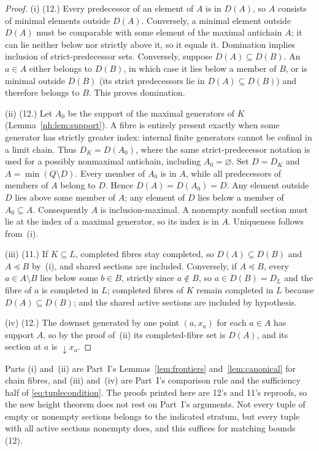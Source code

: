 \documentclass[11pt,a4paper]{article}
\theoremstyle{definition}
\theoremstyle{remark}
\begin{document}
\begin{proof}
(i) (12.) Every predecessor of an element of $A$ is in $D(A)$, so $A$ consists
of minimal elements outside $D(A)$. Conversely, a minimal element outside
$D(A)$ must be comparable with some element of the maximal antichain $A$; it
can lie neither below nor strictly above it, so it equals it. Domination
implies inclusion of strict-predecessor sets. Conversely, suppose
$D(A)\subseteq D(B)$. An $a\in A$ either belongs to $D(B)$, in which case it
lies below a member of $B$, or is minimal outside $D(B)$ (its strict
predecessors lie in $D(A)\subseteq D(B)$) and therefore belongs to $B$. This
proves domination.

(ii) (12.) Let $A_0$ be the support of the maximal generators of $K$
(Lemma~\ref{nh:lem:support}). A fibre is entirely present exactly when some
generator has strictly greater index: internal finite generators cannot be
cofinal in a limit chain. Thus $D_K=D(A_0)$, where the same strict-predecessor
notation is used for a possibly nonmaximal antichain, including
$A_0=\varnothing$. Set $D=D_K$ and $A=\min(Q\setminus D)$. Every member of
$A_0$ is in $A$, while all predecessors of members of $A$ belong to $D$. Hence
$D(A)=D(A_0)=D$. Any element outside $D$ lies above some member of $A$; any
element of $D$ lies below a member of $A_0\subseteq A$. Consequently $A$ is
inclusion-maximal. A nonempty nonfull section must lie at the index of a
maximal generator, so its index is in $A$. Uniqueness follows from~(i).

(iii) (11.) If $K\subseteq L$, completed fibres stay completed, so
$D(A)\subseteq D(B)$ and $A\preceq B$ by~(i), and shared sections are
included. Conversely, if
$A\preceq B$, every $a\in A\setminus B$ lies below some $b\in B$, strictly
since $a\notin B$, so $a\in D(B)=D_L$ and the fibre of $a$ is completed in
$L$; completed fibres of $K$ remain completed in $L$ because
$D(A)\subseteq D(B)$; and the shared active sections are
included by hypothesis.

(iv) (12.) The downset generated by one point $(a,x_a)$ for each $a\in A$ has
support $A$, so by the proof of~(ii) its completed-fibre set is $D(A)$, and its
section at $a$ is ${\downarrow}x_a$.
\end{proof}

Parts (i) and~(ii) are Part~I's Lemmas~\ref{lem:frontiers}
and~\ref{lem:canonical} for chain fibres, and (iii) and~(iv) are Part~I's
comparison rule and the sufficiency half of \eqref{eq:tuplecondition}. The
proofs printed here are 12's and 11's reproofs, so the new height theorem does
not rest on Part~I's arguments. Not every tuple of empty or nonempty
sections belongs to the indicated stratum, but every tuple with all active
sections nonempty does, and this suffices for matching bounds (12).
\end{document}

